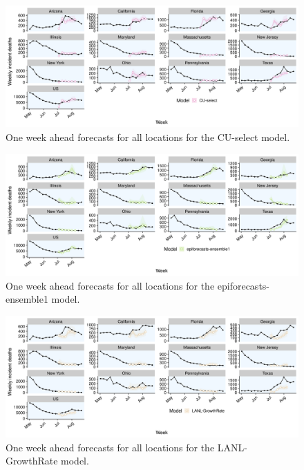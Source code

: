 \documentclass[
]{book}
\begin{document}
\begin{figure}
\includegraphics[width=1\linewidth]{../visualisation/chapter-5-results/scenario-baseline/APPENDIX-CU-select-forecasts} \caption{One week ahead forecasts for all locations for the CU-select model.}\label{fig:predictions-cu-select}
\end{figure}

\begin{figure}
\includegraphics[width=1\linewidth]{../visualisation/chapter-5-results/scenario-baseline/APPENDIX-epiforecasts-ensemble1-forecasts} \caption{One week ahead forecasts for all locations for the epiforecasts-ensemble1 model.}\label{fig:predictions-epiforecasts}
\end{figure}

\begin{figure}
\includegraphics[width=1\linewidth]{../visualisation/chapter-5-results/scenario-baseline/APPENDIX-LANL-GrowthRate-forecasts} \caption{One week ahead forecasts for all locations for the LANL-GrowthRate model.}\label{fig:predictions-lanl-growthrate}
\end{figure}
\end{document}
